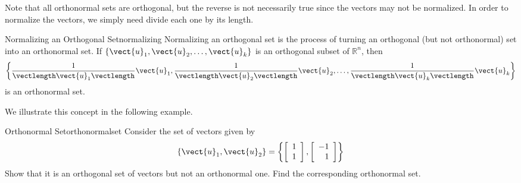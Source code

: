 Note that all orthonormal sets are orthogonal, but the reverse is not
necessarily true since the vectors may not be normalized. In order to
normalize the vectors, we simply need divide each one by its length.

\begin{definition}{Normalizing an Orthogonal Set}{normalizing}
Normalizing an orthogonal set is the process of 
turning an orthogonal (but not orthonormal) set into
an orthonormal set.
If $\{ \vect{u}_1, \vect{u}_2, \ldots, \vect{u}_k\}$
is an orthogonal subset of $\mathbb{R}^n$, 
then 
\[ \left\{
\frac{1}{\vectlength\vect{u}_1\vectlength}\vect{u}_1,
\frac{1}{\vectlength\vect{u}_2\vectlength}\vect{u}_2, \ldots,
\frac{1}{\vectlength\vect{u}_k\vectlength}\vect{u}_k \right\}
\]
is an orthonormal set.
\end{definition}

We illustrate this concept in the following example. 

\begin{example}{Orthonormal Set}{orthonormalset}
Consider the set of vectors  given by 
\[
\left\{ \vect{u}_1, \vect{u}_2 \right\} = \left\{
\left[
\begin{array}{c}
1 \\
1 
\end{array}
\right], 
\left[
\begin{array}{r}
-1 \\
1
\end{array}
\right]
\right\}
\]
Show that it is an orthogonal set of vectors  but not an orthonormal one. Find the corresponding orthonormal set. 
\end{example}

